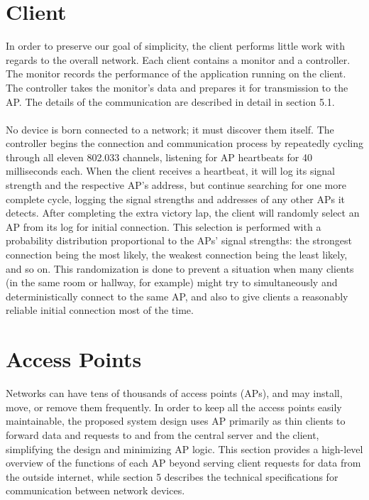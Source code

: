 \documentclass[10pt,journal,compsoc]{IEEEtran}
\begin{document}
		
		\section{Client}
		In order to preserve our goal of simplicity, the client performs little work with regards to the overall network. Each client contains a monitor and a controller. The monitor records the performance of the application running on the client. The controller takes the monitor's data and prepares it for transmission to the AP. The details of the communication are described in detail in section 5.1.\\
		\\
		No device is born connected to a network; it must discover them itself. The controller begins the connection and communication process by repeatedly cycling through all eleven 802.033 channels, listening for AP heartbeats for 40 milliseconds each. When the client receives a heartbeat, it will log its signal strength and the respective AP’s address, but continue searching for one more complete cycle, logging the signal strengths and addresses of any other APs it detects. After completing the extra victory lap, the client will randomly select an AP from its log for initial connection. This selection is performed with a probability distribution proportional to the APs' signal strengths: the strongest connection being the most likely, the weakest connection being the least likely, and so on. This randomization is done to prevent a situation when many clients (in the same room or hallway, for example) might try to simultaneously and deterministically connect to the same AP, and also to give clients a reasonably reliable initial connection most of the time.
		
		\section{Access Points}
		Networks can have tens of thousands of access points (APs), and may install, move, or remove them frequently. In order to keep all the access points easily maintainable, the proposed system design uses AP primarily as thin clients to forward data and requests to and from the central server and the client, simplifying the design and minimizing AP logic. This section provides a high-level overview of the functions of each AP beyond serving client requests for data from the outside internet, while section 5 describes the technical specifications for communication between network devices.
		
\end{document}
